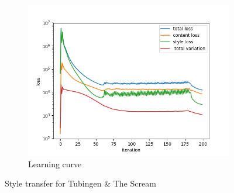 \documentclass[12pt]{article}
\begin{document}
\begin{figure}[htbp]
\begin{subfigure}[t]{0.48\textwidth}
        \includegraphics[trim={3in 0in 3in 0in},scale=0.5]{./Homework2/output/hw2p2_fig14.png}
        \caption{Learning curve}
    \label{hw2p2j}
    \end{subfigure}
    \caption{Style transfer for Tubingen \& The Scream}
\end{figure}
\end{document}
